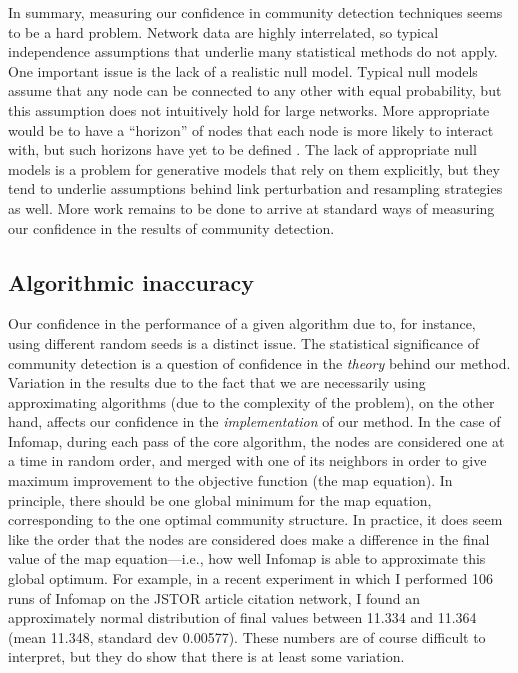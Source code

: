 In summary, measuring our confidence in community detection techniques
seems to be a hard problem. Network data are highly interrelated, so
typical independence assumptions that underlie many statistical methods
do not apply. One important issue is the lack of a realistic null model.
Typical null models assume that any node can be connected to any other
with equal probability, but this assumption does not intuitively hold
for large networks. More appropriate would be to have a ``horizon'' of
nodes that each node is more likely to interact with, but such horizons
have yet to be defined \autocite{fortunato_community_2010}. The lack of
appropriate null models is a problem for generative models that rely on
them explicitly, but they tend to underlie assumptions behind link
perturbation and resampling strategies as well. More work remains to be
done to arrive at standard ways of measuring our confidence in the
results of community detection.

\subsection{Algorithmic inaccuracy}\label{algorithmic-inaccuracy}

Our confidence in the performance of a given algorithm due to, for
instance, using different random seeds is a distinct issue. The
statistical significance of community detection is a question of
confidence in the \emph{theory} behind our method. Variation in the
results due to the fact that we are necessarily using approximating
algorithms (due to the complexity of the problem), on the other hand,
affects our confidence in the \emph{implementation} of our method. In
the case of Infomap, during each pass of the core algorithm, the nodes
are considered one at a time in random order, and merged with one of its
neighbors in order to give maximum improvement to the objective function
(the map equation). In principle, there should be one global minimum for
the map equation, corresponding to the one optimal community structure.
In practice, it does seem like the order that the nodes are considered
does make a difference in the final value of the map equation---i.e.,
how well Infomap is able to approximate this global optimum. For
example, in a recent experiment in which I performed 106 runs of Infomap
on the JSTOR article citation network, I found an approximately normal
distribution of final values between 11.334 and 11.364 (mean 11.348,
standard dev 0.00577). These numbers are of course difficult to
interpret, but they do show that there is at least some variation.

